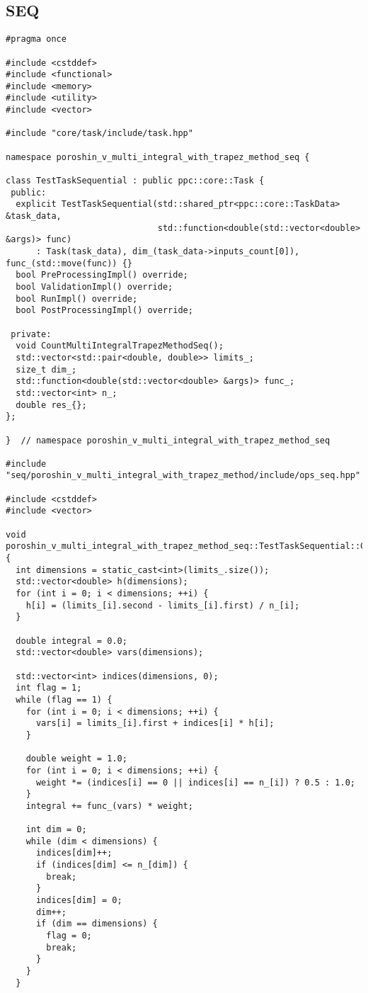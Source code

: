 \documentclass[12pt]{article}
\begin{document}
\subsection*{SEQ}
\begin{lstlisting}
#pragma once

#include <cstddef>
#include <functional>
#include <memory>
#include <utility>
#include <vector>

#include "core/task/include/task.hpp"

namespace poroshin_v_multi_integral_with_trapez_method_seq {

class TestTaskSequential : public ppc::core::Task {
 public:
  explicit TestTaskSequential(std::shared_ptr<ppc::core::TaskData> &task_data,
                              std::function<double(std::vector<double> &args)> func)
      : Task(task_data), dim_(task_data->inputs_count[0]), func_(std::move(func)) {}
  bool PreProcessingImpl() override;
  bool ValidationImpl() override;
  bool RunImpl() override;
  bool PostProcessingImpl() override;

 private:
  void CountMultiIntegralTrapezMethodSeq();
  std::vector<std::pair<double, double>> limits_;
  size_t dim_;
  std::function<double(std::vector<double> &args)> func_;
  std::vector<int> n_;
  double res_{};
};

}  // namespace poroshin_v_multi_integral_with_trapez_method_seq

#include "seq/poroshin_v_multi_integral_with_trapez_method/include/ops_seq.hpp"

#include <cstddef>
#include <vector>

void poroshin_v_multi_integral_with_trapez_method_seq::TestTaskSequential::CountMultiIntegralTrapezMethodSeq() {
  int dimensions = static_cast<int>(limits_.size());
  std::vector<double> h(dimensions);
  for (int i = 0; i < dimensions; ++i) {
    h[i] = (limits_[i].second - limits_[i].first) / n_[i];
  }

  double integral = 0.0;
  std::vector<double> vars(dimensions);

  std::vector<int> indices(dimensions, 0);
  int flag = 1;
  while (flag == 1) {
    for (int i = 0; i < dimensions; ++i) {
      vars[i] = limits_[i].first + indices[i] * h[i];
    }

    double weight = 1.0;
    for (int i = 0; i < dimensions; ++i) {
      weight *= (indices[i] == 0 || indices[i] == n_[i]) ? 0.5 : 1.0;
    }
    integral += func_(vars) * weight;

    int dim = 0;
    while (dim < dimensions) {
      indices[dim]++;
      if (indices[dim] <= n_[dim]) {
        break;
      }
      indices[dim] = 0;
      dim++;
      if (dim == dimensions) {
        flag = 0;
        break;
      }
    }
  }


\end{lstlisting}
\end{document}
